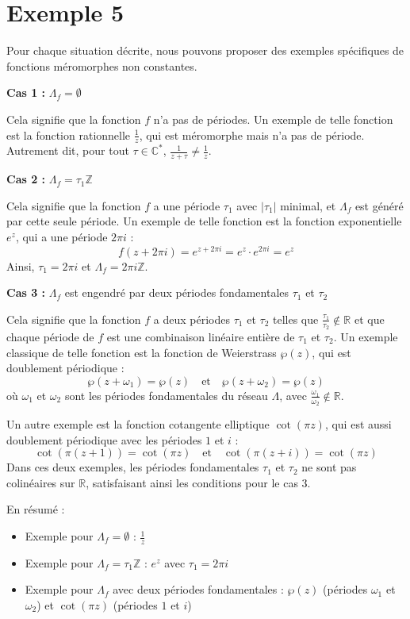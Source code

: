 \documentclass[12pt]{article}
\begin{document}
\section*{Exemple 5}
	Pour chaque situation décrite, nous pouvons proposer des exemples spécifiques de fonctions méromorphes non constantes.

\textbf{Cas 1 :} \(\Lambda_f = \emptyset\)

Cela signifie que la fonction \( f \) n'a pas de périodes. Un exemple de telle fonction est la fonction rationnelle \(\frac{1}{z}\), qui est méromorphe mais n'a pas de période. Autrement dit, pour tout \(\tau \in \mathbb{C}^*\), \(\frac{1}{z + \tau} \neq \frac{1}{z}\).

\textbf{Cas 2 :} \(\Lambda_f = \tau_1 \mathbb{Z}\)

Cela signifie que la fonction \( f \) a une période \(\tau_1\) avec \(|\tau_1|\) minimal, et \(\Lambda_f\) est généré par cette seule période. Un exemple de telle fonction est la fonction exponentielle \( e^z \), qui a une période \(2\pi i\) :
\[
f(z + 2\pi i) = e^{z + 2\pi i} = e^z \cdot e^{2\pi i} = e^z
\]
Ainsi, \(\tau_1 = 2\pi i\) et \(\Lambda_f = 2\pi i \mathbb{Z}\).

\textbf{Cas 3 :} \(\Lambda_f\) est engendré par deux périodes fondamentales \(\tau_1\) et \(\tau_2\)

Cela signifie que la fonction \( f \) a deux périodes \(\tau_1\) et \(\tau_2\) telles que \(\frac{\tau_1}{\tau_2} \notin \mathbb{R}\) et que chaque période de \( f \) est une combinaison linéaire entière de \(\tau_1\) et \(\tau_2\). Un exemple classique de telle fonction est la fonction de Weierstrass \(\wp(z)\), qui est doublement périodique :
\[
\wp(z + \omega_1) = \wp(z) \quad \text{et} \quad \wp(z + \omega_2) = \wp(z)
\]
où \(\omega_1\) et \(\omega_2\) sont les périodes fondamentales du réseau \(\Lambda\), avec \(\frac{\omega_1}{\omega_2} \notin \mathbb{R}\).

Un autre exemple est la fonction cotangente elliptique \(\cot(\pi z)\), qui est aussi doublement périodique avec les périodes \(1\) et \(i\) :
\[
\cot(\pi (z + 1)) = \cot(\pi z) \quad \text{et} \quad \cot(\pi (z + i)) = \cot(\pi z)
\]
Dans ces deux exemples, les périodes fondamentales \(\tau_1\) et \(\tau_2\) ne sont pas colinéaires sur \(\mathbb{R}\), satisfaisant ainsi les conditions pour le cas 3.

En résumé :

\begin{itemize}
	\item Exemple pour \(\Lambda_f = \emptyset\) : \(\frac{1}{z}\)
	\item Exemple pour \(\Lambda_f = \tau_1 \mathbb{Z}\) : \(e^z\) avec \(\tau_1 = 2\pi i\)
	\item Exemple pour \(\Lambda_f\) avec deux périodes fondamentales : \(\wp(z)\) (périodes \(\omega_1\) et \(\omega_2\)) et \(\cot(\pi z)\) (périodes \(1\) et \(i\))
\end{itemize}
\end{document}
